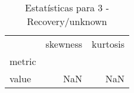 \begin{table}[htbp]
\caption{Estatísticas para 3 - Recovery/unknown}
\label{tab:3_-_recovery_unknown_skewkurt}
\begin{tabular}{lrr}
\toprule
 & skewness & kurtosis \\
metric &  &  \\
\midrule
value & NaN & NaN \\
\bottomrule
\end{tabular}
\end{table}

